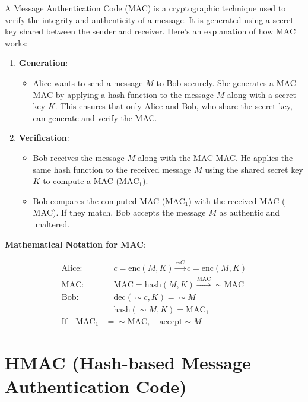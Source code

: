 \documentclass[11pt]{article}
\begin{document}
A Message Authentication Code (MAC) is a cryptographic technique used to verify the integrity and authenticity of a message. It is generated using a secret key shared between the sender and receiver. Here's an explanation of how MAC works:

\begin{enumerate}
    \item \textbf{Generation}: 
    \begin{itemize}
        \item Alice wants to send a message \( M \) to Bob securely. She generates a MAC \( \text{MAC} \) by applying a hash function to the message \( M \) along with a secret key \( K \). This ensures that only Alice and Bob, who share the secret key, can generate and verify the MAC.
    \end{itemize}
    
    \item \textbf{Verification}:
    \begin{itemize}
        \item Bob receives the message \( M \) along with the MAC \( \text{MAC} \). He applies the same hash function to the received message \( M \) using the shared secret key \( K \) to compute a MAC (\( \text{MAC}_1 \)).
        \item Bob compares the computed MAC (\( \text{MAC}_1 \)) with the received MAC (\( \text{MAC} \)). If they match, Bob accepts the message \( M \) as authentic and unaltered.
    \end{itemize}
\end{enumerate}

\textbf{Mathematical Notation for MAC}:

\begin{align*}
\text{Alice:} & \quad c = \text{enc}(M, K) \xrightarrow{\sim C} c = \text{enc}(M, K) \\
\text{MAC:} & \quad \text{MAC} = \text{hash}(M, K) \xrightarrow{\text{MAC}} \sim \text{MAC} \\
\text{Bob:} & \quad \text{dec}(\sim c, K) = \sim M \\
& \quad \text{hash}(\sim M, K) = \text{MAC}_1 \\
\text{If} \quad \text{MAC}_1 & = \sim \text{MAC}, \quad \text{accept} \sim M
\end{align*}

\section*{HMAC (Hash-based Message Authentication Code)}
\end{document}
